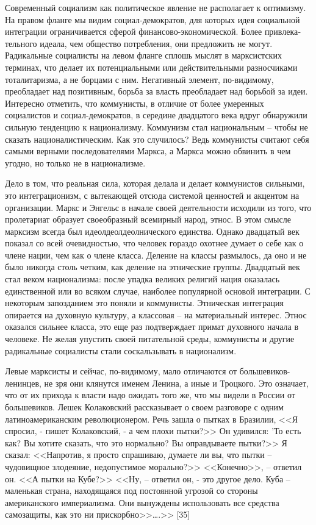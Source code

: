 \documentclass{book}
\begin{document}
Современный социализм как политическое явление не рас­полагает к оптимизму. На правом фланге мы видим социал-демократов, для которых идея социальной интеграции ограни­чивается сферой финансово-экономической. Более привлека­тельного идеала, чем общество потребления, они предложить не могут. Радикальные социалисты на левом фланге сплошь мыс­лят в марксистских терминах, что делает их потенциальными или действительными разносчиками тоталитаризма, а не борца­ми с ним. Негативный элемент, по-видимому, преобладает над позитивным, борьба за власть преобладает над борьбой за идеи.
Интересно отметить, что коммунисты, в отличие от более умеренных социалистов и социал-демократов, в середине двад­цатого века вдруг обнаружили сильную тенденцию к национа­лизму. Коммунизм стал национальным -- чтобы не сказать на­ционалистическим. Как это случилось? Ведь коммунисты счита­ют себя самыми верными последователями Маркса, а Маркса можно обвинить в чем угодно, но только не в национализме.

Дело в том, что реальная сила, которая делала и делает ком­мунистов сильными, это интеграционизм, с вытекающей отсю­да системой ценностей и акцентом на организации. Маркс и Эн­гельс в начале своей деятельности исходили из того, что проле­тариат образует своеобразный всемирный народ, этнос. В этом смысле марксизм всегда был идеолдеолдеолнического единства. Однако двадцатый век показал со всей очевидностью, что чело­век гораздо охотнее думает о себе как о члене нации, чем как о члене класса. Деление на классы размылось, да оно и не было никогда столь четким, как деление на этнические группы. Двадцатый век стал веком национализма: после упадка великих религий нация оказалась единственной или во всяком случае, наиболее популярной основой интеграции. С некоторым за­позданием это поняли и коммунисты. Этническая интеграция опирается на духовную культуру, а классовая -- на материаль­ный интерес. Этнос оказался сильнее класса, это еще раз подт­верждает примат духовного начала в человеке. Не желая упу­стить своей 
питательной среды, коммунисты и другие радикаль­ные социалисты стали соскальзывать в национализм.

Левые марксисты и сейчас, по-видимому, мало отличаются от большевиков-ленинцев, не зря они клянутся именем Ленина, а иные и Троцкого. Это означает, что от их прихода к власти надо ожидать того же, что мы видели в России от большевиков. Лешек Колаковский рассказывает о своем разговоре с одним латиноамериканским революционером. Речь зашла о пытках в Бразилии, <<Я спросил, - пишет Колаковский, - а чем плохи пытки?>> Он удивился: 'То есть как? Вы хотите сказать, что это нормально? Вы оправдываете пытки?>> Я сказал: <<Напротив, я просто спрашиваю, думаете ли вы, что пытки -- чудовищное зло­деяние, недопустимое морально?>> <<Конечно>>, -- ответил он. <<А пытки на Кубе?>> <<Ну, -- ответил он, - это другое дело. Ку­ба -- маленькая страна, находящаяся под постоянной угрозой со стороны американского империализма. Они вынуждены использовать все средства самозащиты, как это ни прискорб­но>>\ldots.>> [35]
\end{document}
